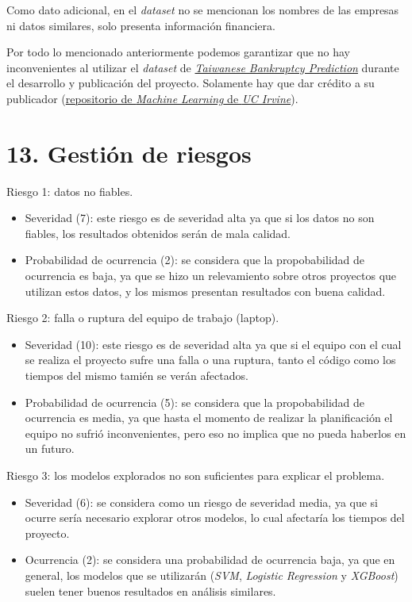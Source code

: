 \documentclass[
11pt, %
]{charter}
\begin{document}
Como dato adicional, en el \textit{dataset} no se mencionan los nombres de las empresas ni datos similares, solo presenta información financiera.

Por todo lo mencionado anteriormente podemos garantizar que no hay inconvenientes al utilizar el \textit{dataset} de \href{https://archive.ics.uci.edu/dataset/572/taiwanese+bankruptcy+prediction}{\textit{Taiwanese Bankruptcy Prediction}} durante el desarrollo y publicación del proyecto. Solamente hay que dar crédito a su publicador (\href{https://archive.ics.uci.edu/}{repositorio de \textit{Machine Learning} de \textit{UC Irvine}}).

\section{13. Gestión de riesgos}
\label{sec:riesgos}

Riesgo 1: datos no fiables.
\begin{itemize}
	\item Severidad (7): este riesgo es de severidad alta ya que si los datos no son fiables, los resultados obtenidos serán de mala calidad.
	\item Probabilidad de ocurrencia (2): se considera que la propobabilidad de ocurrencia es baja, ya que se hizo un relevamiento sobre otros proyectos que utilizan estos datos, y los mismos presentan resultados con buena calidad.
\end{itemize}   

Riesgo 2: falla o ruptura del equipo de trabajo (laptop).
\begin{itemize}
	\item Severidad (10): este riesgo es de severidad alta ya que si el equipo con el cual se realiza el proyecto sufre una falla o una ruptura, tanto el código como los tiempos del mismo tamién se verán afectados.
	\item Probabilidad de ocurrencia (5): se considera que la propobabilidad de ocurrencia es media, ya que hasta el momento de realizar la planificación el equipo no sufrió inconvenientes, pero eso no implica que no pueda haberlos en un futuro.
\end{itemize}   

Riesgo 3: los modelos explorados no son suficientes para explicar el problema.
\begin{itemize}
	\item Severidad (6): se considera como un riesgo de severidad media, ya que si ocurre sería necesario explorar otros modelos, lo cual afectaría los tiempos del proyecto.
	\item Ocurrencia (2): se considera una probabilidad de ocurrencia baja, ya que en general, los modelos que se utilizarán (\textit{SVM}, \textit{Logistic Regression} y \textit{XGBoost}) suelen tener buenos resultados en análisis similares.
\end{itemize}
\end{document}
